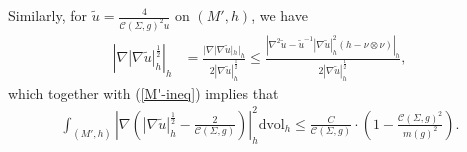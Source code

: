 \documentclass[letter]{amsart}
\theoremstyle{definition}
\theoremstyle{remark}
\begin{document}
Similarly, for $\tilde{u} = \frac{4}{\mathcal{C}(\Sigma ,g)^2 u}$
 on $(M', h)$, we have
\begin{align*}
	\left|\nabla |\nabla \tilde{u}|^{\frac{1}{2}}_h \right|_h & = \frac{|\nabla |\nabla \tilde{u}|_h|_h}{2|\nabla \tilde{u}|_h^{\frac{1}{2}}} 
						       \leq \frac{\left| \nabla ^2 \tilde{u} - \tilde{u}^{-1}|\nabla \tilde{u}|_h^2(h - \nu \otimes \nu ) \right|_h }{2 |\nabla \tilde{u}|_h^{\frac{1}{2}}},
\end{align*}
which together with (\ref{M'-ineq}) implies that 
\begin{align}
	\int_{(M', h)} \left|\nabla \left( |\nabla \tilde{u}|_h^{\frac{1}{2}} - \frac{2}{\mathcal{C}(\Sigma ,g)}\right) \right|_h^2 \mathrm{dvol}_h \leq \frac{C}{\mathcal{C}(\Sigma ,g)}\cdot \left( 1- \frac{\mathcal{C}(\Sigma ,g)^2}{m(g)^2} \right) .
\end{align}
\end{document}
